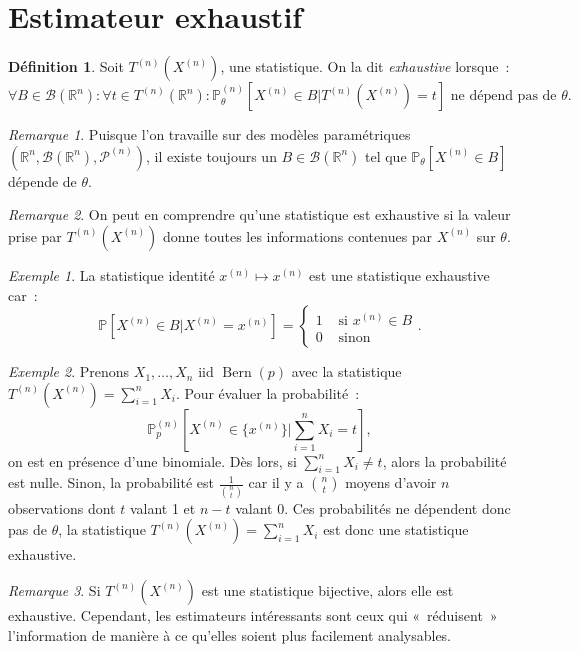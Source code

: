 \documentclass{report}
\DeclareMathOperator{\Bern}{Bern}  %
\renewcommand{\P}{\mathbb P}
\newcommand{\statmod}[4]{\left(#1^{#4}, #2\left(#1^{#4}\right), #3^{\left(#4\right)}\right)}
\newcommand{\R}{\mathbb R}
\newcommand{\Brl}{\mathcal B}  %
\theoremstyle{definition}
\newtheorem{déf}[thm]{Définition}
\theoremstyle{remark}
\newtheorem*{rmq}{Remarque}
\newtheorem{ex}{Exemple}[chapter]
\begin{document}
	\section{Estimateur exhaustif}
		\begin{déf} Soit $T^{(n)}(X^{(n)})$, une statistique. On la dit \textit{exhaustive} lorsque~:
		\[\forall B \in \Brl(\R^n) : \forall t \in T^{(n)}(\R^n) : \P_\theta^{(n)}\left[X^{(n)} \in B | T^{(n)}(X^{(n)}) = t\right] \text{ ne dépend pas de } \theta.\]
		\end{déf}
		
		\begin{rmq} Puisque l'on travaille sur des modèles paramétriques $\statmod \R\Brl{\mathcal P}n$, il existe toujours un $B \in \Brl(\R^n)$ tel que
		$\P_\theta[X^{(n)} \in B]$ dépende de $\theta$.
		\end{rmq}
		
		\begin{rmq} On peut en comprendre qu'une statistique est exhaustive si la valeur prise par $T^{(n)}(X^{(n)})$ donne toutes les informations contenues par
		$X^{(n)}$ sur $\theta$. 
		\end{rmq}
		
		\begin{ex} La statistique identité $x^{(n)} \mapsto x^{(n)}$ est une statistique exhaustive car~:
		\[\P\left[X^{(n)} \in B | X^{(n)} = x^{(n)}\right] =  \begin{cases}1 &\text{ si } x^{(n)} \in B \\0 &\text{ sinon}\end{cases}.\]
		\end{ex}
		
		\begin{ex} Prenons $X_1, \ldots, X_n$ iid $\Bern(p)$ avec la statistique $T^{(n)}(X^{(n)}) = \sum_{i=1}^nX_i$. Pour évaluer la probabilité~:
		\[\P_p^{(n)}\left[X^{(n)} \in \{x^{(n)}\} | \sum_{i=1}^nX_i = t\right],\]
		on est en présence d'une binomiale. Dès lors, si $\sum_{i=1}^nX_i \neq t$, alors la probabilité est nulle. Sinon, la probabilité est $\frac 1{\binom nt}$ car
		il y a $\binom nt$ moyens d'avoir $n$ observations dont $t$ valant 1 et $n-t$ valant 0. Ces probabilités ne dépendent donc pas de $\theta$, la statistique
		$T^{(n)}(X^{(n)}) = \sum_{i=1}^nX_i$ est donc une statistique exhaustive.
		\end{ex}
		
		\begin{rmq} Si $T^{(n)}(X^{(n)})$ est une statistique bijective, alors elle est exhaustive. Cependant, les estimateurs intéressants sont ceux qui «~réduisent~»
		l'information de manière à ce qu'elles soient plus facilement analysables.
		\end{rmq}
		
\end{document}

